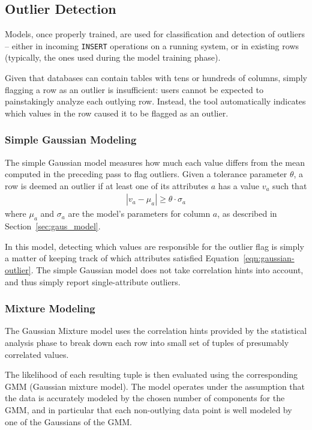 \subsection{Outlier Detection}
\label{sec:outlier-detection}

Models, once properly trained, are used for classification and detection of outliers -- either in incoming \texttt{INSERT} operations on a running system, or in existing rows (typically, the ones used during the model training phase). %

Given that databases can contain tables with tens or hundreds of columns, simply flagging a row as an outlier is insufficient: users cannot be expected to painstakingly analyze each outlying row. Instead, the tool automatically indicates which values in the row caused it to be flagged as an outlier.

\subsubsection{Simple Gaussian Modeling}
The simple Gaussian model measures how much each value differs from the mean computed in the preceding pass to flag outliers. Given a tolerance parameter $\theta$, a row is deemed an outlier if at least one of its attributes $a$ has a value $v_a$ such that
\begin{align}
  |v_a - \mu_a| \ge \theta \cdot \sigma_a
  \label{eqn:gaussian-outlier}
\end{align}
where $\mu_a$ and $\sigma_a$ are the model's parameters for column $a$, as described in Section~\ref{sec:gaus_model}.

In this model, detecting which values are responsible for the outlier flag is simply a matter of keeping track of which attributes satisfied Equation~\eqref{eqn:gaussian-outlier}. The simple Gaussian model does not take correlation hints into account, and thus simply report single-attribute outliers.

\subsubsection{Mixture Modeling}
The Gaussian Mixture model uses the correlation hints provided by the statistical analysis phase to break down each row into small set of tuples of presumably correlated values.

The likelihood of each resulting tuple is then evaluated using the corresponding GMM (Gaussian mixture model). The model operates under the assumption that the data is accurately modeled by the chosen number of components for the GMM, and in particular that each non-outlying data point is well modeled by one of the Gaussians of the GMM. 

